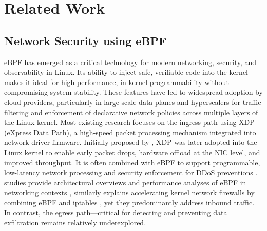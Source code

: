 \documentclass [11pt, proquest] {uwthesis}[2020/02/24]
\begin{document}
\chapter {Related Work}
\section{Network Security using eBPF}
eBPF has emerged as a critical technology for modern networking, security, and observability in Linux. Its ability to inject safe, verifiable code into the kernel makes it ideal for high-performance, in-kernel programmability without compromising system stability. These features have led to widespread adoption by cloud providers, particularly in large-scale data planes and hyperscalers for traffic filtering and enforcement of declarative network policies across multiple layers of the Linux kernel. Most existing research focuses on the ingress path using XDP (eXpress Data Path), a high-speed packet processing mechanism integrated into network driver firmware. Initially proposed by \citeauthor{10.1145/3281411.3281443}, XDP was later adopted into the Linux kernel to enable early packet drops, hardware offload at the NIC level, and improved throughput. It is often combined with eBPF to support programmable, low-latency network processing and security enforcement for DDoS preventions \cite{10.1145/3281411.3281443, 8850758}.
\citeauthor{10.1145/3371038} studies provide architectural overviews and performance analyses of eBPF in networking contexts \cite{10.1145/3371038}, similarly \citeauthor{bertrone2018accelerating} explains accelerating kernel network firewalls by combining eBPF and iptables \cite{bertrone2018accelerating}, yet they predominantly address inbound traffic. In contrast, the egress path—critical for detecting and preventing data exfiltration remains relatively underexplored. 

\end{document}
